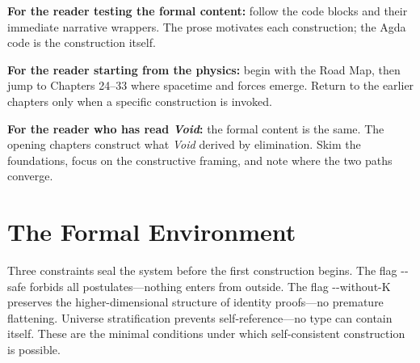\documentclass[11pt,a4paper]{book}
\newcommand{\AgdaFlag}[1]{\texttt{-{}-#1}}
\def\texttt#1{#1}%
\begin{document}
\textbf{For the reader testing the formal content:} follow the code blocks and their immediate narrative wrappers. The prose motivates each construction; the Agda code is the construction itself.

\textbf{For the reader starting from the physics:} begin with the Road Map, then jump to Chapters 24--33 where spacetime and forces emerge. Return to the earlier chapters only when a specific construction is invoked.

\textbf{For the reader who has read \textit{Void}:} the formal content is the same. The opening chapters construct what \textit{Void} derived by elimination. Skim the foundations, focus on the constructive framing, and note where the two paths converge.

\section*{The Formal Environment}

Three constraints seal the system before the first construction begins. The flag \AgdaFlag{safe} forbids all postulates---nothing enters from outside. The flag \AgdaFlag{without-K} preserves the higher-dimensional structure of identity proofs---no premature flattening. Universe stratification prevents self-reference---no type can contain itself. These are the minimal conditions under which self-consistent construction is possible.
\end{document}
